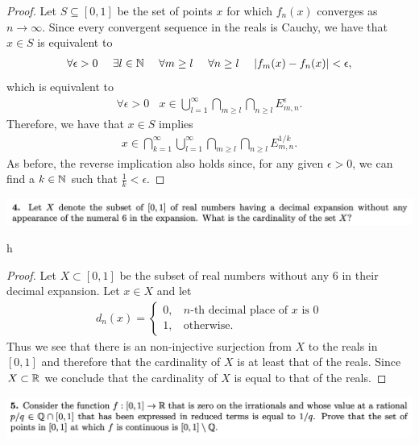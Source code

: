 \begin{proof}
  Let $S \subseteq [0, 1]$ be the set of points $x$ for which $f_n(x)$ converges as $n \to \infty$. Since every
  convergent sequence in the reals is Cauchy, we have that $x \in S$ is equivalent to
  \begin{align*}
    \forall \epsilon > 0 ~~~~ \exists l \in \mathbb{N} ~~~~ \forall m \geq l ~~~~ \forall n \geq l ~~~~ |f_m(x) - f_n(x)| < \epsilon,
  \end{align*}
  which is equivalent to
  \begin{align*}
    \forall \epsilon > 0 ~~~~ x \in \bigcup_{l=1}^\infty \bigcap_{m \geq l} \bigcap_{n \geq l} E_{m,n}^\epsilon.
  \end{align*}
  Therefore, we have that $x \in S$ implies
  \begin{align*}
    x \in \bigcap_{k=1}^\infty \bigcup_{l=1}^\infty \bigcap_{m \geq l} \bigcap_{n \geq l} E_{m,n}^{1/k}.
  \end{align*}
  As before, the reverse implication also holds since, for any given $\epsilon > 0$, we can find a $k \in \mathbb{N}$
  such that $\frac{1}{k} < \epsilon$.
\end{proof}

\includegraphics[width=400pt]{img/analysis--berkeley-202a--homework-1-f175.png}


h
\begin{proof}
  Let $X \subset [0, 1]$ be the subset of real numbers without any 6 in their decimal expansion. Let $x \in X$ and let
  \begin{align*}
    d_n(x) =
    \begin{cases}
      0, ~~~~ n\text{-th decimal place of }x \text{ is }0\\
      1, ~~~~ \text{otherwise}.
    \end{cases}
  \end{align*}
  Thus we see that there is an non-injective surjection from $X$ to the reals in $[0, 1]$ and therefore that
  the cardinality of $X$ is at least that of the reals. Since $X \subset \mathbb{R}$ we conclude that the cardinality
  of $X$ is equal to that of the reals.
\end{proof}


\includegraphics[width=400pt]{img/analysis--berkeley-202a--homework-1-5192.png}


